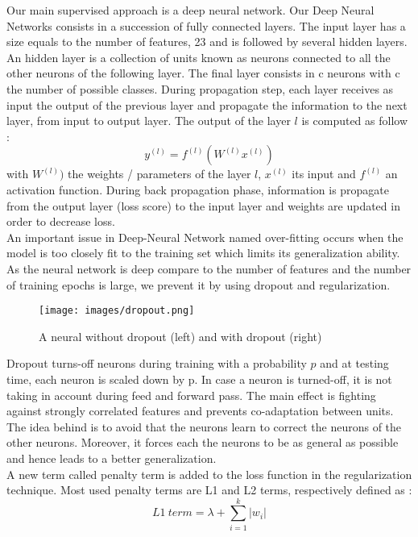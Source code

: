 \documentclass{llncs}
\begin{document}
Our main supervised approach is a deep neural network. 
Our Deep Neural Networks consists in a succession of fully connected layers. 
The input layer has a size equals to the number of features, 23 and is followed by several hidden layers. 
An hidden layer is a collection of units known as neurons connected to all the other neurons of the following layer.
The final layer consists in c neurons with c the number of possible classes. 
During propagation step, each layer receives as input the output of the previous layer and propagate the information to the next layer, from input to output layer. 
The output of the layer $l$ is computed as follow :
\begin{equation}
y^{(l)} = f^{(l)}(W^{(l)}x^{(l)})
\end{equation}
with $W^{(l)})$ the weights / parameters of the layer $l$, $x^{(l)}$ its input and $f^{(l)}$ an activation function.
During back propagation phase, information is propagate from the output layer (loss score) to the input layer and weights are updated in order to decrease loss.
\\An important issue in Deep-Neural Network named over-fitting occurs when the model is too closely fit to the training set which limits its generalization ability. As the neural network is deep compare to the number of features and the number of training epochs is large, we prevent it by using dropout and regularization.
\begin{figure}[tb]
\centering
\texttt{[image: images/dropout.png]}
\caption{A neural without dropout (left) and with dropout (right)}
\label{fig:dropout-schema}
\end{figure}
Dropout turns-off neurons during training with a probability $p$ and at testing time, each neuron is scaled down by p. In case a neuron is turned-off, it is not taking in account during feed and forward pass.
The main effect is fighting against strongly correlated features and prevents co-adaptation between units. The idea behind is to avoid that the neurons learn to correct the neurons of the other neurons. Moreover, it forces each the neurons to be as general as possible and hence leads to a better generalization. 
\\ A new term called penalty term is added to the loss function in the regularization technique. Most used penalty terms are L1 and L2 terms, respectively defined as : 
\begin{equation}
L1\ term = \lambda + \sum\limits_{i=1}^k |w_{i}|
\end{equation}
\end{document}

